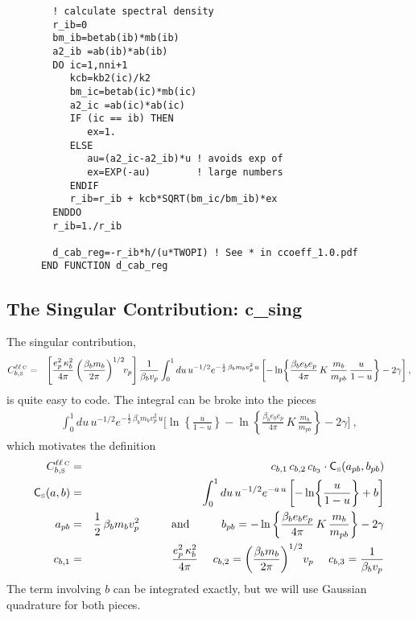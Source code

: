 \documentclass[preprint,12pt,eqsecnum,nofootinbib,amsmath,amssymb]{revtex4}
\newcommand{\smC}{{\rm\scriptscriptstyle C}}
\newcommand{\smS}{{\rm\scriptscriptstyle S}}
\begin{document}
{{{\begin{verbatim}
        ! calculate spectral density
        r_ib=0
        bm_ib=betab(ib)*mb(ib)
        a2_ib =ab(ib)*ab(ib)
        DO ic=1,nni+1
           kcb=kb2(ic)/k2
           bm_ic=betab(ic)*mb(ic)
           a2_ic =ab(ic)*ab(ic)
           IF (ic == ib) THEN
              ex=1.
           ELSE
              au=(a2_ic-a2_ib)*u ! avoids exp of 
              ex=EXP(-au)        ! large numbers
           ENDIF
           r_ib=r_ib + kcb*SQRT(bm_ic/bm_ib)*ex
        ENDDO      
        r_ib=1./r_ib 

        d_cab_reg=-r_ib*h/(u*TWOPI) ! See * in ccoeff_1.0.pdf
      END FUNCTION d_cab_reg
\end{verbatim}
}




\subsection{The Singular Contribution: c\_sing}

The singular contribution,
\begin{eqnarray}
  C^{\ell \ell \, \smC}_{b,\smS} 
  &=& 
  \left[
  \frac{e_p^2\, \kappa_b^2}{4\pi}
  \left( \frac{\beta_b m_b}{2\pi} \right)^{1/2} \!\! v_p
  \right]
  \frac{1}{\beta_b v_p}
  \int_0^1 du\, u^{-1/2} e^{-\frac{1}{2}\, \beta_b m_b v_p^2 \,u}
  \left[-\ln\!\left\{\frac{\beta_b e_b e_p}{4\pi}\,K\,
  \frac{m_b}{m_{pb}}\,\frac{u}{1-u} \right\} 
  -2\gamma
  \right] ,
\nonumber\\
\end{eqnarray}
is quite easy to code. The integral can be broke into the pieces
\begin{eqnarray}
  \int_0^1 du\, u^{-1/2} e^{-\frac{1}{2}\, \beta_b m_b v_p^2 \,u}
  \Bigg[\ln\!\left\{\frac{u}{1-u} \right\} 
  -\ln\left\{\frac{\beta_b e_b e_p}{4\pi}\,K\,
  \frac{m_b}{m_{pb}}\right\} 
  -2\gamma \Bigg] \ ,
\end{eqnarray}
which motivates the definition
\begin{eqnarray}
  C^{\ell\ell \, \smC}_{b,\smS} 
  &=& 
  c_{b, 1}\, c_{b, 2} \, c_{b_3}
  \cdot 
  {\sf C}_\smS(a_{pb},b_{pb})
\\
  {\sf C}_\smS(a,b)
  &=&
  \int_0^1 du\, u^{-1/2} e^{-a \,u}
  \left[-\ln\!\left\{\frac{u}{1-u} \right\} + b \right]
\\
  a_{pb} &=& \frac{1}{2}\, \beta_b m_b v_p^2
  \hskip1cm 
  \text{and}
  \hskip1cm 
  b_{pb} =
  -\ln\left\{\frac{\beta_b e_b e_p}{4\pi}\,K\,
  \frac{m_b}{m_{pb}}\right\} -2\gamma 
\\
  c_{b, 1} &=& \frac{e_p^2\, \kappa_b^2}{4\pi}
  ~~~~
  c_{b, 2} =
  \left( \frac{\beta_b m_b}{2\pi} \right)^{1/2} \! v_p  
    ~~~~
  c_{b, 3} = \frac{1}{\beta_b v_p}
\end{eqnarray}
The term involving $b$ can be integrated exactly, but we will use
Gaussian quadrature for both pieces. 

}}
\end{document}

